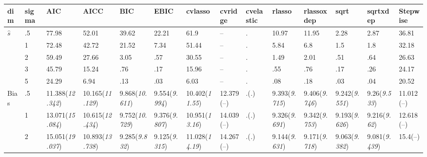 \documentclass{article}
\begin{document}
\begin{table}[tbp] \centering
{}

{\tiny
\begin{tabularx}{\textwidth}{lCCCCCCCCCCCCC}

\toprule
{dim}&{sigma}&{AIC}&{AICC}&{BIC}&{EBIC}&{cvlasso}&{cvridge}&{cvelastic}&{rlasso}&{rlassoxdep}&{sqrt}&{sqrtxdep}&{Stepwise} \tabularnewline
\midrule\addlinespace[1.5ex]
$\hat{s}$&.5&77.98&52.01&39.62&22.21&61.9&--&.&10.97&11.95&2.28&2.87&36.81 \tabularnewline
&1&72.48&42.72&21.52&7.34&51.44&--&.&5.84&6.8&1.5&1.8&32.18 \tabularnewline
&2&59.49&27.66&3.05&.57&30.55&--&.&1.49&2.01&.51&.64&26.63 \tabularnewline
&3&45.79&15.24&.76&.17&15.96&--&.&.55&.76&.17&.26&24.17 \tabularnewline
&5&24.29&6.94&.13&.03&6.03&--&.&.08&.18&.03&.04&20.52 \tabularnewline
\midrule Bias&.5&11.388\newline (\emph{12.342})&10.165\newline (\emph{11.129})&9.868\newline (\emph{10.611})&9.554\newline (\emph{9.994})&10.402\newline (\emph{11.55})&12.379\newline (--)&.\newline (\emph{.})&9.393\newline (\emph{9.715})&9.406\newline (\emph{9.746})&9.242\newline (\emph{9.551})&9.26\newline (\emph{9.533})&11.012\newline (--) \tabularnewline
&1&13.071\newline (\emph{15.084})&10.615\newline (\emph{12.434})&9.752\newline (\emph{10.729})&9.376\newline (\emph{9.807})&10.951\newline (\emph{13.16})&14.039\newline (--)&.\newline (\emph{.})&9.326\newline (\emph{9.691})&9.342\newline (\emph{9.753})&9.193\newline (\emph{9.626})&9.216\newline (\emph{9.62})&12.618\newline (--) \tabularnewline
&2&15.051\newline (\emph{19.037})&10.893\newline (\emph{13.738})&9.285\newline (\emph{9.832})&9.125\newline (\emph{9.315})&11.028\newline (\emph{14.19})&14.267\newline (--)&.\newline (\emph{.})&9.144\newline (\emph{9.631})&9.171\newline (\emph{9.718})&9.063\newline (\emph{9.382})&9.081\newline (\emph{9.439})&15.4\newline (--) \tabularnewline

\end{tabularx}}
\end{table}
\end{document}
